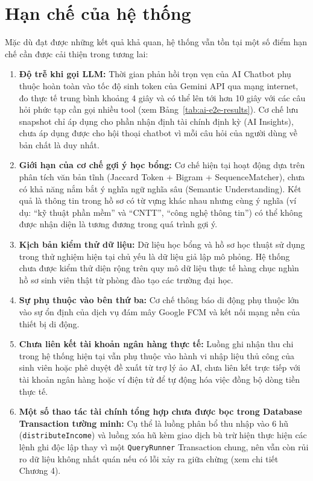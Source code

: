 \section{Hạn chế của hệ thống}
Mặc dù đạt được những kết quả khả quan, hệ thống vẫn tồn tại một số điểm hạn chế cần được cải thiện trong tương lai:
\begin{enumerate}
    \item \textbf{Độ trễ khi gọi LLM:} Thời gian phản hồi trọn vẹn của AI Chatbot phụ thuộc hoàn toàn vào tốc độ sinh token của Gemini API qua mạng internet, đo thực tế trung bình khoảng 4 giây và có thể lên tới hơn 10 giây với các câu hỏi phức tạp cần gọi nhiều tool (xem Bảng~\ref{tab:ai-e2e-results}). Cơ chế lưu snapshot chỉ áp dụng cho phần nhận định tài chính định kỳ (AI Insights), chưa áp dụng được cho hội thoại chatbot vì mỗi câu hỏi của người dùng về bản chất là duy nhất.
    \item \textbf{Giới hạn của cơ chế gợi ý học bổng:} Cơ chế hiện tại hoạt động dựa trên phân tích văn bản tĩnh (Jaccard Token + Bigram + SequenceMatcher), chưa có khả năng nắm bắt ý nghĩa ngữ nghĩa sâu (Semantic Understanding). Kết quả là thông tin trong hồ sơ có từ vựng khác nhau nhưng cùng ý nghĩa (ví dụ: ``kỹ thuật phần mềm'' và ``CNTT'', ``công nghệ thông tin'') có thể không được nhận diện là tương đương trong quá trình gợi ý.
    \item \textbf{Kịch bản kiểm thử dữ liệu:} Dữ liệu học bổng và hồ sơ học thuật sử dụng trong thử nghiệm hiện tại chủ yếu là dữ liệu giả lập mô phỏng. Hệ thống chưa được kiểm thử diện rộng trên quy mô dữ liệu thực tế hàng chục nghìn hồ sơ sinh viên thật từ phòng đào tạo các trường đại học.
    \item \textbf{Sự phụ thuộc vào bên thứ ba:} Cơ chế thông báo di động phụ thuộc lớn vào sự ổn định của dịch vụ đám mây Google FCM và kết nối mạng nền của thiết bị di động.
    \item \textbf{Chưa liên kết tài khoản ngân hàng thực tế:} Luồng ghi nhận thu chi trong hệ thống hiện tại vẫn phụ thuộc vào hành vi nhập liệu thủ công của sinh viên hoặc phê duyệt đề xuất từ trợ lý ảo AI, chưa liên kết trực tiếp với tài khoản ngân hàng hoặc ví điện tử để tự động hóa việc đồng bộ dòng tiền thực tế.
    \item \textbf{Một số thao tác tài chính tổng hợp chưa được bọc trong Database Transaction tường minh:} Cụ thể là luồng phân bổ thu nhập vào 6 hũ (\texttt{distributeIncome}) và luồng xóa hũ kèm giao dịch bù trừ hiện thực hiện các lệnh ghi độc lập thay vì một \texttt{QueryRunner} Transaction chung, nên vẫn còn rủi ro dữ liệu không nhất quán nếu có lỗi xảy ra giữa chừng (xem chi tiết Chương 4).

\end{enumerate}
